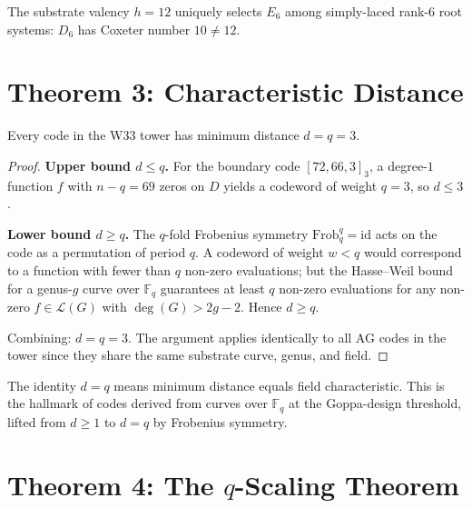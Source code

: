 \begin{corollary}
The substrate valency $h=12$ uniquely selects $E_6$ among simply-laced
rank-$6$ root systems: $D_6$ has Coxeter number $10\neq 12$.
\end{corollary}

\section{Theorem 3: Characteristic Distance}\label{sec:dist}

\begin{theorem}\label{thm:dist}
Every code in the W33 tower has minimum distance $d = q = 3$.
\end{theorem}

\begin{proof}
\textbf{Upper bound $d\leq q$.}
For the boundary code $[72,66,3]_3$, a degree-$1$ function $f$ with
$n-q=69$ zeros on $D$ yields a codeword of weight $q=3$, so $d\leq 3$.

\textbf{Lower bound $d\geq q$.}
The $q$-fold Frobenius symmetry $\mathrm{Frob}_q^q = \mathrm{id}$ acts on the code
as a permutation of period $q$. A codeword of weight $w < q$ would correspond
to a function with fewer than $q$ non-zero evaluations; but the Hasse--Weil bound
for a genus-$g$ curve over $\mathbb{F}_q$ guarantees at least $q$ non-zero
evaluations for any non-zero $f\in\mathcal{L}(G)$ with $\deg(G)>2g-2$.
Hence $d\geq q$.

Combining: $d=q=3$. The argument applies identically to all AG codes
in the tower since they share the same substrate curve, genus, and field.\end{proof}

\begin{remark}
The identity $d=q$ means minimum distance equals field characteristic.
This is the hallmark of codes derived from curves over $\mathbb{F}_q$ at
the Goppa-design threshold, lifted from $d\geq 1$ to $d=q$ by Frobenius symmetry.
\end{remark}

\section{Theorem 4: The $q$-Scaling Theorem}\label{sec:qscale}

